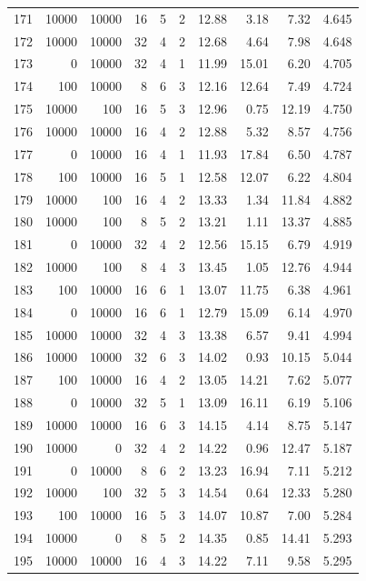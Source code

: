 \begin{footnotesize}
\begin{longtable}{@{}rrrrrrrrrr@{}}
171 & 10000 & 10000 & 16 & 5 & 2 & 12.88 & 3.18 & 7.32 & 4.645 \\
172 & 10000 & 10000 & 32 & 4 & 2 & 12.68 & 4.64 & 7.98 & 4.648 \\
173 & 0 & 10000 & 32 & 4 & 1 & 11.99 & 15.01 & 6.20 & 4.705 \\
174 & 100 & 10000 & 8 & 6 & 3 & 12.16 & 12.64 & 7.49 & 4.724 \\
175 & 10000 & 100 & 16 & 5 & 3 & 12.96 & 0.75 & 12.19 & 4.750 \\
176 & 10000 & 10000 & 16 & 4 & 2 & 12.88 & 5.32 & 8.57 & 4.756 \\
177 & 0 & 10000 & 16 & 4 & 1 & 11.93 & 17.84 & 6.50 & 4.787 \\
178 & 100 & 10000 & 16 & 5 & 1 & 12.58 & 12.07 & 6.22 & 4.804 \\
179 & 10000 & 100 & 16 & 4 & 2 & 13.33 & 1.34 & 11.84 & 4.882 \\
180 & 10000 & 100 & 8 & 5 & 2 & 13.21 & 1.11 & 13.37 & 4.885 \\
181 & 0 & 10000 & 32 & 4 & 2 & 12.56 & 15.15 & 6.79 & 4.919 \\
182 & 10000 & 100 & 8 & 4 & 3 & 13.45 & 1.05 & 12.76 & 4.944 \\
183 & 100 & 10000 & 16 & 6 & 1 & 13.07 & 11.75 & 6.38 & 4.961 \\
184 & 0 & 10000 & 16 & 6 & 1 & 12.79 & 15.09 & 6.14 & 4.970 \\
185 & 10000 & 10000 & 32 & 4 & 3 & 13.38 & 6.57 & 9.41 & 4.994 \\
186 & 10000 & 10000 & 32 & 6 & 3 & 14.02 & 0.93 & 10.15 & 5.044 \\
187 & 100 & 10000 & 16 & 4 & 2 & 13.05 & 14.21 & 7.62 & 5.077 \\
188 & 0 & 10000 & 32 & 5 & 1 & 13.09 & 16.11 & 6.19 & 5.106 \\
189 & 10000 & 10000 & 16 & 6 & 3 & 14.15 & 4.14 & 8.75 & 5.147 \\
190 & 10000 & 0 & 32 & 4 & 2 & 14.22 & 0.96 & 12.47 & 5.187 \\
191 & 0 & 10000 & 8 & 6 & 2 & 13.23 & 16.94 & 7.11 & 5.212 \\
192 & 10000 & 100 & 32 & 5 & 3 & 14.54 & 0.64 & 12.33 & 5.280 \\
193 & 100 & 10000 & 16 & 5 & 3 & 14.07 & 10.87 & 7.00 & 5.284 \\
194 & 10000 & 0 & 8 & 5 & 2 & 14.35 & 0.85 & 14.41 & 5.293 \\
195 & 10000 & 10000 & 16 & 4 & 3 & 14.22 & 7.11 & 9.58 & 5.295 \\

\end{longtable}
\end{footnotesize}
